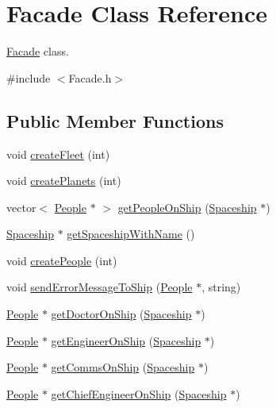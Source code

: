 \hypertarget{classFacade}{}\section{Facade Class Reference}
\label{classFacade}


\hyperlink{classFacade}{Facade} class.  




{\ttfamily \#include $<$Facade.\+h$>$}

\subsection*{Public Member Functions}
\begin{DoxyCompactItemize}
\item 
void \hyperlink{classFacade_a1bac00087158eb5c52c31d38d3b0c5dd}{create\+Fleet} (int)
\item 
void \hyperlink{classFacade_ac8e923ca1b69cf459137572132a034b1}{create\+Planets} (int)
\item 
vector$<$ \hyperlink{classPeople}{People} $\ast$ $>$ \hyperlink{classFacade_ae17d6bf514b5b0b3ee2ccb4f1b6abcb7}{get\+People\+On\+Ship} (\hyperlink{classSpaceship}{Spaceship} $\ast$)
\item 
\hyperlink{classSpaceship}{Spaceship} $\ast$ \hyperlink{classFacade_a361ae4cbe6acd8bb8039f111fd6f437d}{get\+Spaceship\+With\+Name} ()
\item 
void \hyperlink{classFacade_aa4349e600d23bffb8077cfcf991ec115}{create\+People} (int)
\item 
void \hyperlink{classFacade_a91364a59aa7aedae6111ca81c01bab25}{send\+Error\+Message\+To\+Ship} (\hyperlink{classPeople}{People} $\ast$, string)
\item 
\hyperlink{classPeople}{People} $\ast$ \hyperlink{classFacade_addc3c5f6eee5a886287af62c910546e0}{get\+Doctor\+On\+Ship} (\hyperlink{classSpaceship}{Spaceship} $\ast$)
\item 
\hyperlink{classPeople}{People} $\ast$ \hyperlink{classFacade_a63631cca1ed46f8adb96083a72c169ca}{get\+Engineer\+On\+Ship} (\hyperlink{classSpaceship}{Spaceship} $\ast$)
\item 
\hyperlink{classPeople}{People} $\ast$ \hyperlink{classFacade_a3a5f6c00871cd14664a1f4ef1376bb9d}{get\+Comms\+On\+Ship} (\hyperlink{classSpaceship}{Spaceship} $\ast$)
\item 
\hyperlink{classPeople}{People} $\ast$ \hyperlink{classFacade_af607a431f6654f447620a47f6373ded3}{get\+Chief\+Engineer\+On\+Ship} (\hyperlink{classSpaceship}{Spaceship} $\ast$)

\end{DoxyCompactItemize}
